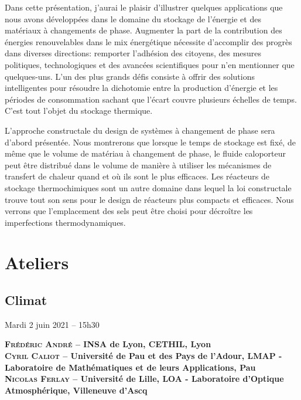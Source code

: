 Dans cette présentation, j’aurai le plaisir d’illustrer quelques applications que nous avons développées dans le domaine du stockage de l’énergie et des matériaux à changements de phase. Augmenter la part de la contribution des énergies renouvelables dans le mix énergétique nécessite d’accomplir des progrès dans diverses directions: remporter l’adhésion des citoyens, des mesures politiques, technologiques et des avancées scientifiques pour n’en mentionner que quelques-uns. L’un des plus grands défis consiste à offrir des solutions intelligentes pour résoudre la dichotomie entre la production d’énergie et les périodes de consommation sachant que l’écart couvre plusieurs échelles de temps. C’est tout l’objet du stockage thermique.

L’approche constructale du design de systèmes à changement de phase sera d’abord présentée. Nous montrerons que lorsque le temps de stockage est fixé, de même que le volume de matériau à changement de phase, le fluide caloporteur peut être distribué dans le volume de manière à utiliser les mécanismes de transfert de chaleur quand et où ils sont le plus efficaces. Les réacteurs de stockage thermochimiques sont un autre domaine dans lequel la loi constructale trouve tout son sens pour le design de réacteurs plus compacts et efficaces. Nous verrons que l’emplacement des sels peut être choisi pour décroître les imperfections thermodynamiques. 


\newpage
{}\section*{Ateliers}


{}\subsection*{Climat}
%
\begin{center}
Mardi 2 juin 2021 -- 15h30
\end{center}

\hspace{0.04\linewidth}\vrule\hspace{0.01\linewidth}\parbox{0.9\linewidth}{
\textbf{{\scshape Frédéric André} -- INSA de Lyon, CETHIL, Lyon}\\
\textbf{{\scshape Cyril Caliot} -- Université de Pau et des Pays de l’Adour, LMAP - Laboratoire de Mathématiques et de leurs Applications, Pau}\\
\textbf{{\scshape Nicolas Ferlay} -- Université de Lille, LOA - Laboratoire d’Optique Atmosphérique, Villeneuve d'Ascq}
}\\[2ex]

